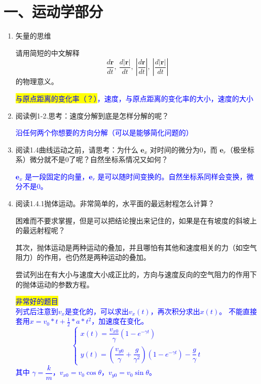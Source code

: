 \documentclass[12pt,a4paper]{article}
\begin{document}
\section{一、运动学部分}
\begin{enumerate}[label=\arabic*.,leftmargin=*]
    \item 矢量的思维
    
    请用简短的中文解释
    \[
    \frac{d\boldsymbol{r}}{dt},\ \frac{d|\boldsymbol{r}|}{dt},\ \left|\frac{d\boldsymbol{r}}{dt}\right|,\ \left|\frac{d|\boldsymbol{r}|}{dt}\right|
    \]
    的物理意义。
    
    \textcolor{blue}{\colorbox{yellow}{与原点距离的变化率（？）}，速度，与原点距离的变化率的大小，速度的大小}

    \item 阅读例1-2.思考：速度分解到底是怎样分解的呢？
    
    \textcolor{blue}{沿任何两个你想要的方向分解（可以是能够简化问题的）}

    \item 阅读1.4曲线运动之前，请思考：为什么 $\boldsymbol{e}_x$ 对时间的微分为0，而 $\boldsymbol{e}_r$（极坐标系）微分就不是0了呢？自然坐标系情况又如何？
    
    \textcolor{blue}{$\boldsymbol{e}_x$ 是一段固定的向量，$\boldsymbol{e}_r$ 是可以随时间变换的。自然坐标系同样会变换，微分不是0。}

    \item 阅读1.4.1抛体运动。非常简单的，水平面的最远射程怎么计算？
    
    困难而不要求掌握，但是可以把结论搜出来记住的，如果是在有坡度的斜坡上的最远射程呢？
    
    其次，抛体运动是两种运动的叠加，并且哪怕有其他和速度相关的力（如空气阻力）的作用，也仍然是两种运动的叠加。
    
    尝试列出在有大小与速度大小成正比的，方向与速度反向的空气阻力的作用下的抛体运动的参数方程。
    
    \textcolor{blue}{
    \colorbox{yellow}{非常好的题目}\\
    列式后注意到$v_x$是变化的，可以求出$v_x (t)$，再次积分求出$x(t)$。
    不能直接套用$x=v_0*t+\frac{1}{2}*a*t^2$，加速度在变化。
    \[
    \begin{cases}
    x(t)=\dfrac{v_{x0}}{\gamma}\left(1-e^{-\gamma t}\right)\\[6pt]
    y(t)=\left(\dfrac{v_{y0}}{\gamma}+\dfrac{g}{\gamma^2}\right)\left(1-e^{-\gamma t}\right)-\dfrac{g}{\gamma}\,t
    \end{cases}
    \]
    其中 $\gamma=\dfrac{k}{m}$，$v_{x0}=v_0\cos\theta$，$v_{y0}=v_0\sin\theta$。
    }


\end{enumerate}
\end{document}
